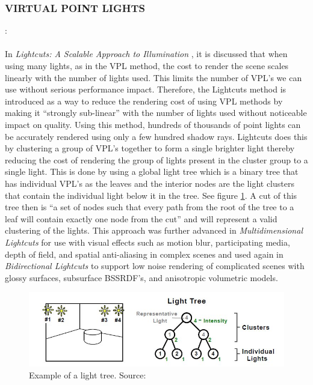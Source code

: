 \subsubsection{VIRTUAL POINT LIGHTS}: 
\paragraph{}
In \textit{Lightcuts: A Scalable Approach to Illumination} \cite{Walter2005a}, it is discussed that when using many lights, as in the VPL method, the cost to render the scene scales linearly with the number of lights used.  This limits the number of VPL's we can use without serious performance impact.  Therefore, the Lightcuts method is introduced as a way to reduce the rendering cost of using VPL methods by making it “strongly sub-linear” with the number of lights used without noticeable impact on quality.  Using this method, hundreds of thousands of point lights can be accurately rendered using only a few hundred shadow rays.  Lightcuts does this by clustering a group of VPL's together to form a single brighter light thereby reducing the cost of rendering the group of lights present in the cluster group to a single light.  This is done by using a global light tree which is a binary tree that has individual VPL's as the leaves and the interior nodes are the light clusters that contain the individual light below it in the tree.  See figure \ref{fig:lightTree}.  A cut of this tree then is ``a set of nodes such that every path from the root of the tree to a leaf will contain exactly one node from the cut'' and will represent a valid clustering of the lights.  This approach was further advanced in \textit{Multidimensional Lightcuts} \cite{Walter2006} for use with visual effects such as motion blur, participating media, depth of field, and spatial anti-aliasing in complex scenes and used again in \textit{Bidirectional Lightcuts} \cite{Walter2012} to support low noise rendering of complicated scenes with glossy surfaces, subsurface BSSRDF's, and anisotropic volumetric models.

\begin{figure}[h!]
  \centering
    \includegraphics[width=1.0\textwidth]{lightTree.jpg}
  \caption{Example of a light tree. Source: \protect\cite{Walter2005a}}
	\label{fig:lightTree}
\end{figure}


